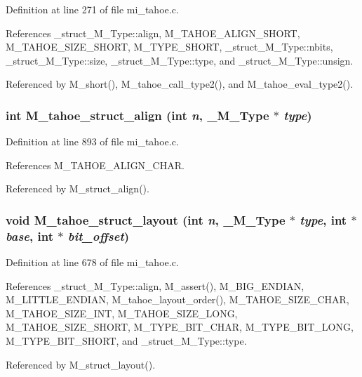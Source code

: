 Definition at line 271 of file mi\_\-tahoe.c.

References \_\-struct\_\-M\_\-Type::align, M\_\-TAHOE\_\-ALIGN\_\-SHORT, M\_\-TAHOE\_\-SIZE\_\-SHORT, M\_\-TYPE\_\-SHORT, \_\-struct\_\-M\_\-Type::nbits, \_\-struct\_\-M\_\-Type::size, \_\-struct\_\-M\_\-Type::type, and \_\-struct\_\-M\_\-Type::unsign.

Referenced by M\_\-short(), M\_\-tahoe\_\-call\_\-type2(), and M\_\-tahoe\_\-eval\_\-type2().
\subsubsection{\setlength{\rightskip}{0pt plus 5cm}int M\_\-tahoe\_\-struct\_\-align (int {\em n}, \bf{\_\-M\_\-Type} $\ast$ {\em type})}\label{m__tahoe_8h_4b3f100f176c0f4c0eb97d284f988ffd}




Definition at line 893 of file mi\_\-tahoe.c.

References M\_\-TAHOE\_\-ALIGN\_\-CHAR.

Referenced by M\_\-struct\_\-align().
\subsubsection{\setlength{\rightskip}{0pt plus 5cm}void M\_\-tahoe\_\-struct\_\-layout (int {\em n}, \bf{\_\-M\_\-Type} $\ast$ {\em type}, int $\ast$ {\em base}, int $\ast$ {\em bit\_\-offset})}\label{m__tahoe_8h_2f5c57da620826d5ee7f5ebe89c52968}




Definition at line 678 of file mi\_\-tahoe.c.

References \_\-struct\_\-M\_\-Type::align, M\_\-assert(), M\_\-BIG\_\-ENDIAN, M\_\-LITTLE\_\-ENDIAN, M\_\-tahoe\_\-layout\_\-order(), M\_\-TAHOE\_\-SIZE\_\-CHAR, M\_\-TAHOE\_\-SIZE\_\-INT, M\_\-TAHOE\_\-SIZE\_\-LONG, M\_\-TAHOE\_\-SIZE\_\-SHORT, M\_\-TYPE\_\-BIT\_\-CHAR, M\_\-TYPE\_\-BIT\_\-LONG, M\_\-TYPE\_\-BIT\_\-SHORT, and \_\-struct\_\-M\_\-Type::type.

Referenced by M\_\-struct\_\-layout().
